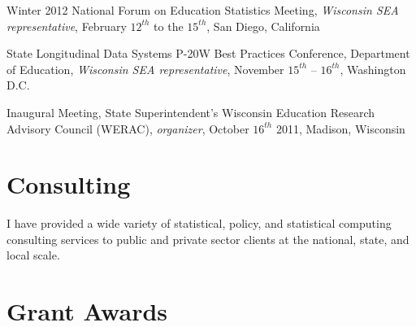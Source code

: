 \documentclass[margin,line]{res}
\begin{document}
\begin{resume}
Winter 2012 National Forum on Education Statistics Meeting, \emph{Wisconsin SEA representative}, February $12^{th}$ to the $15^{th}$, San Diego, California

State Longitudinal Data Systems P-20W Best Practices Conference, Department of Education, \emph{Wisconsin SEA representative}, November $15^{th}$ -- $16^{th}$, Washington D.C.


Inaugural Meeting, State Superintendent's Wisconsin Education Research Advisory Council (WERAC), \emph{organizer}, October $16^{th}$ 2011, Madison, Wisconsin






\section{\sc Consulting}

I have provided a wide variety of statistical, policy, and statistical computing 
consulting services to public and private sector clients at the national, state, 
and local scale. 

\section{\sc Grant Awards}



\end{resume}
\end{document}
